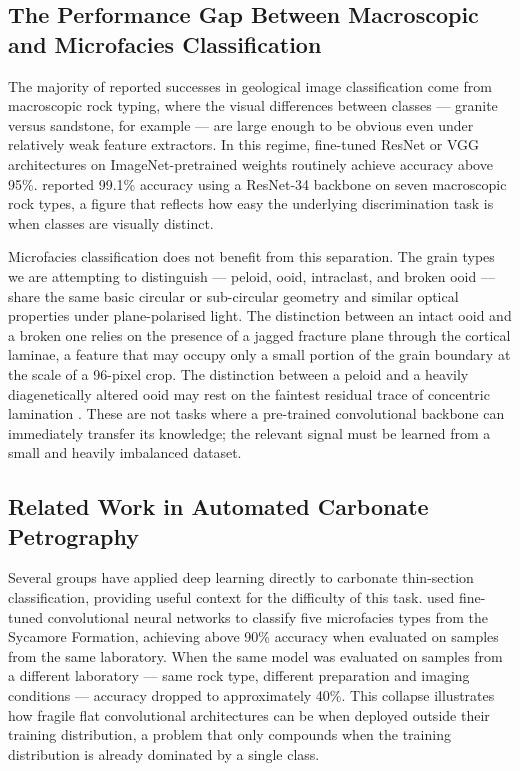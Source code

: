 \documentclass[a4paper,fleqn]{cas-dc}
\begin{document}
\subsection{The Performance Gap Between Macroscopic and Microfacies Classification}
The majority of reported successes in geological image classification come from macroscopic rock typing, where the visual differences between classes --- granite versus sandstone, for example --- are large enough to be obvious even under relatively weak feature extractors. In this regime, fine-tuned ResNet or VGG architectures on ImageNet-pretrained weights routinely achieve accuracy above 95\%. \citet{chen2023} reported 99.1\% accuracy using a ResNet-34 backbone on seven macroscopic rock types, a figure that reflects how easy the underlying discrimination task is when classes are visually distinct.

Microfacies classification does not benefit from this separation. The grain types we are attempting to distinguish --- peloid, ooid, intraclast, and broken ooid --- share the same basic circular or sub-circular geometry and similar optical properties under plane-polarised light. The distinction between an intact ooid and a broken one relies on the presence of a jagged fracture plane through the cortical laminae, a feature that may occupy only a small portion of the grain boundary at the scale of a 96-pixel crop. The distinction between a peloid and a heavily diagenetically altered ooid may rest on the faintest residual trace of concentric lamination \citep{flugel2010}. These are not tasks where a pre-trained convolutional backbone can immediately transfer its knowledge; the relevant signal must be learned from a small and heavily imbalanced dataset.

\subsection{Related Work in Automated Carbonate Petrography}
\label{sec:lit_taxonnet}
Several groups have applied deep learning directly to carbonate thin-section classification, providing useful context for the difficulty of this task. \citet{pireslima2020} used fine-tuned convolutional neural networks to classify five microfacies types from the Sycamore Formation, achieving above 90\% accuracy when evaluated on samples from the same laboratory. When the same model was evaluated on samples from a different laboratory --- same rock type, different preparation and imaging conditions --- accuracy dropped to approximately 40\%. This collapse illustrates how fragile flat convolutional architectures can be when deployed outside their training distribution, a problem that only compounds when the training distribution is already dominated by a single class.
\end{document}
